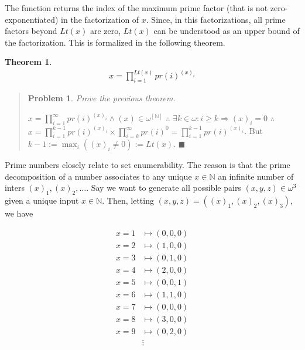 \documentclass[a4paper, 12pt]{article}
\newtheorem{problem}{Problem}
\newtheorem{theorem}{Theorem}
\newtheorem{problem}{Problem}
\newtheorem{theorem}{Theorem}
\begin{document}
The function returns the index of the maximum prime factor (that is not
zero-exponentiated) in the factorization of $x$. Since, in this factorizations,
all prime factors beyond $Lt(x)$ are zero, $Lt(x)$ can be understood as an
upper bound of the factorization. This is formalized in the following theorem.

\begin{theorem}
    \begin{align*}
        x = \prod_{i=1}^{Lt(x)}  pr(i)^{(x)_i}
    \end{align*}
\end{theorem}


\small
\begin{quote}


\begin{problem}
    Prove the previous theorem.
\end{problem}

$x = \prod_{i=1}^{\infty} pr(i)^{(x)_i} \land (x) \in
\omega^{[\mathbb{N}]}$ $\therefore$  $\exists k \in \omega :  i
\geq k \Rightarrow (x)_i =
0$ $\therefore $ $x = \prod_{i=1}^{k - 1} pr(i)^{(x)_i} \times \prod_{i=k}^{\infty}
pr(i)^{0} = \prod_{i=1}^{k-1} pr(i)^{(x)_i} $. But $k - 1 := \max_{i} \left(
(x)_i \neq 0 \right) := Lt(x)$. $\blacksquare$


\end{quote}
\normalsize

Prime numbers closely relate to set enumerability. The reason is that the prime
decomposition of a number associates to any unique $x \in \mathbb{N}$ an
infinite number of inters $(x)_1, (x)_2, \ldots$. Say we want to generate
all possible pairs $(x, y, z) \in \omega^3$ given a unique input $x \in
\mathbb{N}$. Then, letting $(x, y, z) = \left( (x)_1, (x)_2, (x)_3 \right) $, we
have 

\begin{align*}
    x = 1 &\mapsto (0, 0, 0)\\ 
    x = 2 &\mapsto (1, 0, 0)\\
    x = 3 &\mapsto (0, 1, 0)\\
    x = 4 &\mapsto (2, 0, 0)\\
    x = 5 &\mapsto (0, 0, 1)\\
    x = 6 &\mapsto (1, 1, 0)\\ 
    x = 7 &\mapsto (0, 0, 0)\\
    x = 8 &\mapsto (3, 0, 0)\\
    x = 9 &\mapsto (0, 2, 0)\\ 
      &\vdots
\end{align*}
\end{document}
